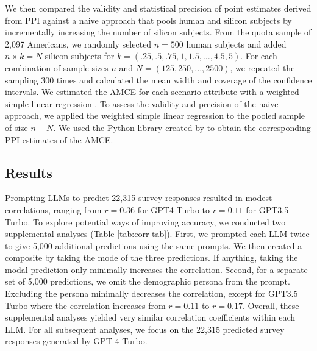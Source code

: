 \documentclass{article}
\begin{document}
We then compared the validity and statistical precision of point estimates derived from PPI against a naive approach that pools human and silicon subjects by incrementally increasing the number of silicon subjects. From the quota sample of 2,097 Americans, we randomly selected $n=500$ human subjects and added $n\times k =N$ silicon subjects for $k=(.25, .5, .75, 1, 1.5, \dots,4.5,5)$. For each combination of sample sizes $n$ and $N=(125,250,...,2500)$, we repeated the sampling 300 times and calculated the mean width and coverage of the confidence intervals. We estimated the AMCE for each scenario attribute with a weighted simple linear regression \citep{hainmueller_causal_2014}. To assess the validity and precision of the naive approach, we applied the weighted simple linear regression to the pooled sample of size $n+N$. We used the Python library created by \citet{angelopoulos_prediction-powered_2023-1, angelopoulos2024ppi} to obtain the corresponding PPI estimates of the AMCE.

\subsection{Results}

Prompting LLMs to predict 22,315 survey responses resulted in modest correlations, ranging from $r=0.36$ for GPT4 Turbo to $r=0.11$ for GPT3.5 Turbo. To explore potential ways of improving accuracy, we conducted two supplemental analyses (Table \ref{tab:corr-tab}). First, we prompted each LLM twice to give 5,000 additional predictions using the same prompts. We then created a composite by taking the mode of the three predictions. If anything, taking the modal prediction only minimally increases the correlation. Second, for a separate set of 5,000 predictions, we omit the demographic persona from the prompt. Excluding the persona minimally decreases the correlation, except for GPT3.5 Turbo where the correlation increases from $r=0.11$ to $r=0.17$. Overall, these supplemental analyses yielded very similar correlation coefficients within each LLM. For all subsequent analyses, we focus on the 22,315 predicted survey responses generated by GPT-4 Turbo.

\clearpage
\end{document}
